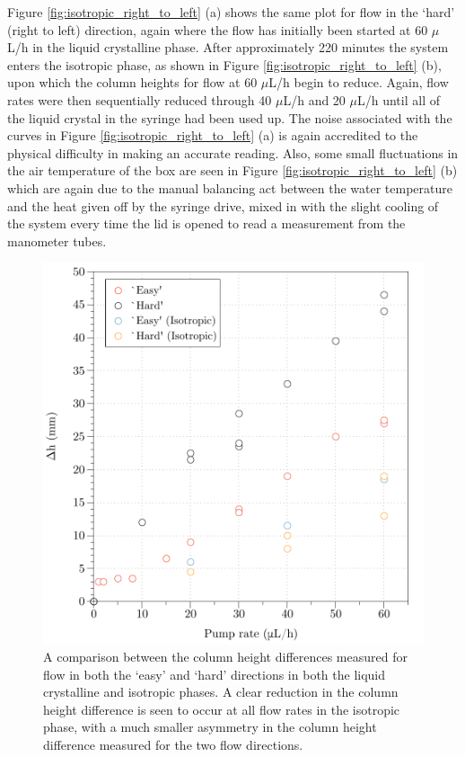Figure \ref{fig:isotropic_right_to_left} (a) shows the same plot for flow in the `hard' (right to left) direction, again where the flow has initially been started at 60 $\mu$L/h in the liquid crystalline phase. After approximately 220 minutes the system enters the isotropic phase, as shown in Figure \ref{fig:isotropic_right_to_left} (b), upon which the column heights for flow at 60 $\mu$L/h begin to reduce. Again, flow rates were then sequentially reduced through 40 $\mu$L/h and 20 $\mu$L/h until all of the liquid crystal in the syringe had been used up. The noise associated with the curves in Figure \ref{fig:isotropic_right_to_left} (a) is again accredited to the physical difficulty in making an accurate reading. Also, some small fluctuations in the air temperature of the box are seen in Figure \ref{fig:isotropic_right_to_left} (b) which are again due to the manual balancing act between the water temperature and the heat given off by the syringe drive, mixed in with the slight cooling of the system every time the lid is opened to read a measurement from the manometer tubes.

\begin{figure}
\begin{center}
\includegraphics{Figures/Diode/second_diode/isotropic/iso_diff}
\end{center}
\caption[Summary of column height differences in nematic and isotropic phases]{\label{fig:iso_diode_diff} A comparison between the column height differences measured for flow in both the `easy' and `hard' directions in both the liquid crystalline and isotropic phases. A clear reduction in the column height difference is seen to occur at all flow rates in the isotropic phase, with a much smaller asymmetry in the column height difference measured for the two flow directions.}
\end{figure}

